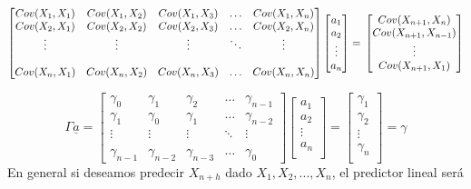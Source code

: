 \documentclass[
  a4paper,
  oneside,
  openany]{book}
\begin{document}
\[
\begin{bmatrix}
    Cov(X_1,X_1)       & Cov(X_1,X_2)  & Cov(X_1,X_3) & \dots & Cov(X_1,X_n)  \\
    Cov(X_2,X_1)        & Cov(X_2,X_2)  & Cov(X_2,X_3)  & \dots &Cov(X_2,X_n)  \\
      \vdots & \vdots & \vdots & \ddots & \vdots \\ \\
    Cov(X_n,X_1)        & Cov(X_n,X_2)  & Cov(X_n,X_3)  & \dots & Cov(X_n,X_n) 
\end{bmatrix}
\begin{bmatrix}
a_1\\
a_2\\
\vdots\\
a_n\\
\end{bmatrix}
= \\
\begin{bmatrix}
Cov(X_{n+1},X_n)  \\
Cov(X_{n+1},X_{n-1})  \\
    \vdots\\
Cov(X_{n+1},X_1)  \\
\end{bmatrix}
\]

\[
\Gamma\underline{a} = \begin{bmatrix}
    \gamma_0      & \gamma_1  & \gamma_2 & \dots & \gamma_{n-1}  \\
   \gamma_1       & \gamma_0  & \gamma_1  & \dots &\gamma_{n-2}  \\
      \vdots & \vdots & \vdots & \ddots & \vdots \\ \\
    \gamma_{n-1}       & \gamma_{n-2}  & \gamma_{n-3}  & \dots & \gamma_0 
\end{bmatrix}
\begin{bmatrix}
a_1\\
a_2\\
\vdots\\
a_n\\
\end{bmatrix}
=
\begin{bmatrix}
\gamma_1  \\
\gamma_2  \\
    \vdots\\
\gamma_{n}\\
\end{bmatrix} = \gamma
\]
En general si deseamos predecir \(X_{n+h}\) dado \({X_1,X_2,...,X_n}\), el predictor lineal será
\end{document}
